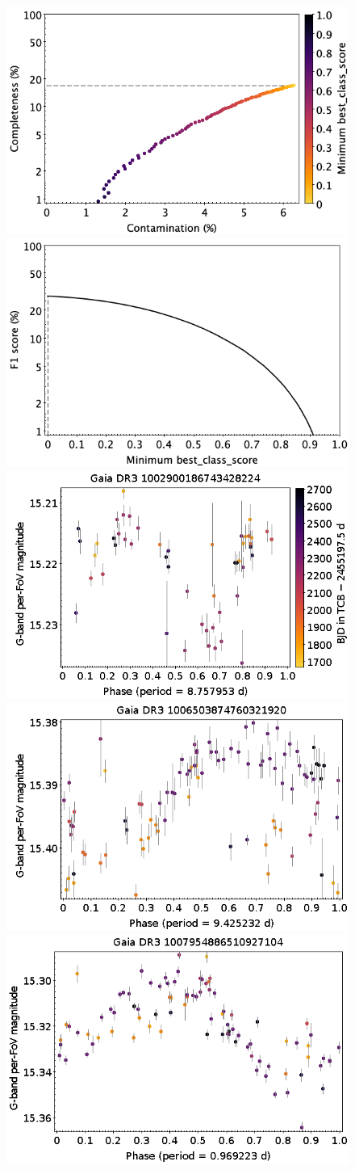\documentclass[longauth]{aa}
\begin{document}
\begin{appendix}
\begin{figure}
\centering
{} \includegraphics[width=0.45\hsize]{figures/appendix/SOLAR_LIKE_cls_scc.png}  
\hspace{2mm}
 \includegraphics[width=0.45\hsize]{figures/appendix/SOLAR_LIKE_cls_sf1.png} \\ 
\vspace{4mm}
 \includegraphics[width=0.45\hsize]{figures/appendix/Rotational_Modulation-12.png}  
\hspace{2mm}
 \includegraphics[width=0.45\hsize]{figures/appendix/Rotational_Modulation-45.png} \\
\vspace{4mm}
 \includegraphics[width=0.45\hsize]{figures/appendix/Rotational_Modulation-90.png}  

\end{figure}
\end{appendix}
\end{document}
